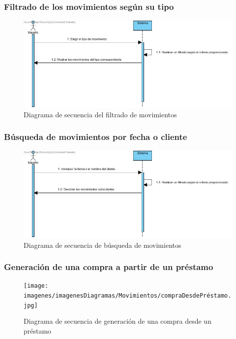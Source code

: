 \subsubsection{Filtrado de los movimientos según su tipo}

\begin{figure}[H]
	\centering
	\includegraphics[width=1\textwidth]{imagenes/imagenesDiagramas/Movimientos/filtrarMovimientos.jpg}
	\caption{Diagrama de secuencia del filtrado de movimientos}
	\label{fig:seqdiag25}
\end{figure}

\subsubsection{Búsqueda de movimientos por fecha o cliente}

\begin{figure}[H]
	\centering
	\includegraphics[width=1\textwidth]{imagenes/imagenesDiagramas/Movimientos/buscarMovimientos.jpg}
	\caption{Diagrama de secuencia de búsqueda de movimientos}
	\label{fig:seqdiag26}
\end{figure}

\subsubsection{Generación de una compra a partir de un préstamo}

\begin{figure}[H]
	\centering
	\texttt{[image: imagenes/imagenesDiagramas/Movimientos/compraDesdePréstamo.jpg]}
	\caption{Diagrama de secuencia de generación de una compra desde un préstamo}
	\label{fig:seqdiag27}
\end{figure}

